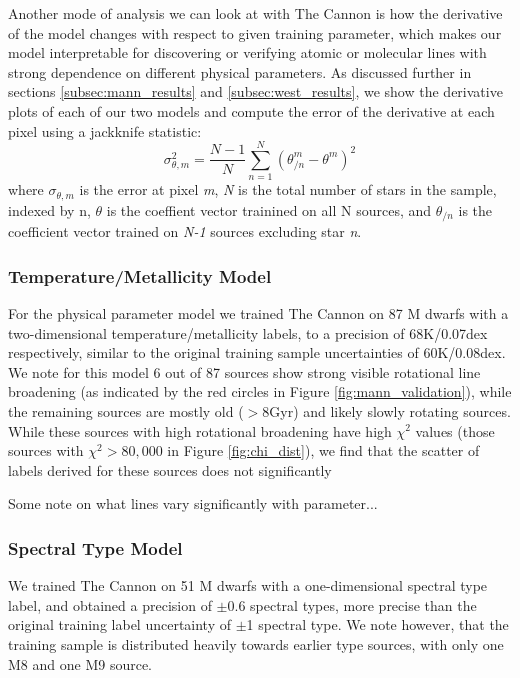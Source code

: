 \documentclass[modern]{aastex62}
\begin{document}
Another mode of analysis we can look at with The Cannon is how the derivative of the model changes with respect to given training parameter, which makes our model interpretable for discovering or verifying atomic or molecular lines with strong dependence on different physical parameters. As discussed further in sections \ref{subsec:mann_results} and \ref{subsec:west_results}, we show the derivative plots of each of our two models and compute the error of the derivative at each pixel using a jackknife statistic:
	\[\sigma_{\theta,m}^2 = \frac{N-1}{N} \sum^N_{n=1} (\theta_{/n}^m - \theta^m)^2 \]
where $\sigma_{\theta,m}$ is the error at pixel \emph{m}, \emph{N} is the total number of stars in the sample, indexed by n, $\theta$ is the coeffient vector trainined on all N sources, and $\theta_{/n}$ is the coefficient vector trained on \emph{N-1} sources excluding star \emph{n}.


\subsubsection{Temperature/Metallicity Model \label{subsec:mann_results}}
For the physical parameter model we trained The Cannon on 87 M dwarfs with a two-dimensional temperature/metallicity labels, to a precision of 68K/0.07dex respectively, similar to the original training sample uncertainties of 60K/0.08dex. We note for this model 6 out of 87 sources show strong visible rotational line broadening (as indicated by the red circles in Figure \ref{fig:mann_validation}), while the remaining sources are mostly old ($>8$Gyr) and likely slowly rotating sources. While these sources with high rotational broadening have high $\chi^2$ values (those sources with $\chi^2 > 80,000$ in Figure \ref{fig:chi_dist}), we find that the scatter of labels derived for these sources does not significantly 

Some note on what lines vary significantly with parameter...

\color{gcolor}{HOGG: Some commentary on why $\chi^2$ is higher than expected.}\color{black}


\subsubsection{Spectral Type Model \label{subsec:west_results}}
We trained The Cannon on 51 M dwarfs with a one-dimensional spectral type label, and obtained a precision of $\pm$0.6 spectral types, more precise than the original training label uncertainty of $\pm$1 spectral type. We note however, that the training sample is distributed heavily towards earlier type sources, with only one M8 and one M9 source.
\end{document}
